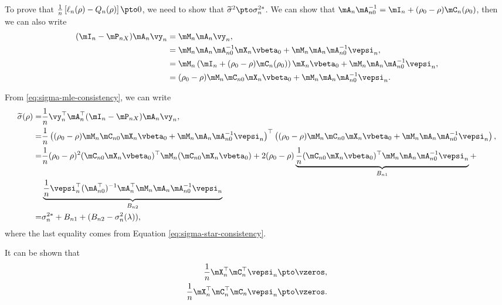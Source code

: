 \documentclass[english,12pt]{book}\usepackage[]{graphicx}\usepackage[]{xcolor}
\begin{document}
\begin{subappendices}
To prove that $\frac{1}{n}\left[\ell_n(\rho) - Q_n(\rho)\right]\pto 0$, we need to show that $\widetilde{\sigma}^{2}\pto \sigma^{2*}_n$. We can show that $\mA_n\mA_{n0}^{-1} = \mI_n + (\rho_0 - \rho)\mC_n(\rho_0)$, then we can also write
\begin{equation*}
\begin{aligned}
  (\mI_n - \mP_{nX})\mA_n\vy_n & = \mM_n\mA_n\vy_n, \\
                               & = \mM_n\mA_n\mA_{n0}^{-1}\mX_n\vbeta_0 + \mM_n\mA_n\mA_{n0}^{-1}\vepsi_n, \\
& = \mM_n\left(\mI_n + (\rho_0 - \rho)\mC_n(\rho_0)\right)\mX_n\vbeta_0 + \mM_n\mA_n\mA_{n0}^{-1}\vepsi_n,       \\
& = (\rho_0 - \rho)\mM_n\mC_{n0}\mX_n\vbeta_0 + \mM_n\mA_n\mA_{n0}^{-1}\vepsi_n. 
\end{aligned}
\end{equation*}

From \eqref{eq:sigma-mle-consistency}, we can write
\begin{equation*}
\begin{aligned}
\widetilde{\sigma}(\rho)  = & \frac{1}{n}\vy_n^\top\mA_n^\top(\mI_n - \mP_{nX})\mA_n\vy_n, \\
 = & \frac{1}{n}\left((\rho_0 - \rho)\mM_n\mC_{n0}\mX_n\vbeta_0 + \mM_n\mA_n\mA_{n0}^{-1}\vepsi_n \right)^\top \left((\rho_0 - \rho)\mM_n\mC_{n0}\mX_n\vbeta_0 + \mM_n\mA_n\mA_{n0}^{-1}\vepsi_n \right), \\
 = & \frac{1}{n}(\rho_0 - \rho)^2(\mC_{n0}\mX_n\vbeta_0)^\top\mM_n(\mC_{n0}\mX_n\vbeta_0) + 2(\rho_0 - \rho)\underbrace{\frac{1}{n}(\mC_{n0}\mX_n\vbeta_0)^\top\mM_n\mA_n\mA_{n0}^{-1}\vepsi_n}_{B_{n1}} +  \\
& \underbrace{\frac{1}{n}\vepsi_n^\top(\mA_{n0}^\top)^{-1}\mA_n^\top\mM_n\mA_n\mA_{n0}^{-1}\vepsi_n}_{B_{n2}} \\
= & \sigma^{2*}_n + B_{n1} + (B_{n2} - \sigma^2_n(\lambda)), 
\end{aligned}
\end{equation*}
%
where the last equality comes from Equation \eqref{eq:sigma-star-consistency}. 

It can be shown that 
\begin{equation}
    \begin{aligned}
      \frac{1}{n}\mX_n^\top\mC_n^\top\vepsi_n \pto \vzeros, \\
      \frac{1}{n}\mX_n^\top\mC_n^\top\mC_n\vepsi_n \pto \vzeros. 
    \end{aligned}
\end{equation}


\end{subappendices}
\end{document}
